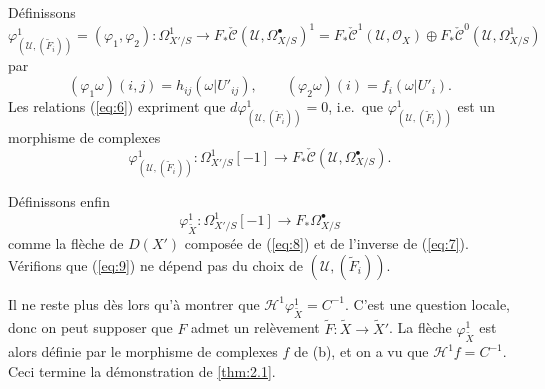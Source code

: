 \documentclass[12pt,a4paper]{article}
\theoremstyle{plain}
\theoremstyle{definition}
\theoremstyle{remark}
\newcommand{\cO}{\mathcal{O}}
\begin{document}
D\'efinissons
\[
\varphi^1_{(\mathscr{U}, (\tilde{F}_i))} = (\varphi_1, \varphi_2): \Omega^1_{X'/S} \to F_* \check{\mathscr{C}}(\mathscr{U}, \Omega^{\bullet}_{X/S})^1 = F_* \check{\mathscr{C}}^1(\mathscr{U}, \cO_X) \oplus F_* \check{\mathscr{C}}^0(\mathscr{U}, \Omega^1_{X/S})
\]
par
\[
(\varphi_1 \omega)(i,j) = h_{ij}(\omega|U'_{ij}), \qquad (\varphi_2 \omega)(i) = f_i(\omega|U'_i).
\]
Les relations (\ref{eq:6}) expriment que $d\varphi^1_{(\mathscr{U}, (\tilde{F}_i))} = 0$, i.e.~que $\varphi^1_{(\mathscr{U}, (\tilde{F}_i))}$ est un morphisme de complexes
\begin{equation}\label{eq:8}
\varphi^1_{(\mathscr{U}, (\tilde{F}_i))}: \Omega^1_{X'/S}[-1] \to F_* \check{\mathscr{C}}(\mathscr{U}, \Omega^{\bullet}_{X/S}).
\end{equation}

D\'efinissons enfin
\begin{equation}\label{eq:9}
\varphi^1_{\tilde{X}}: \Omega^1_{X'/S}[-1] \to F_* \Omega^{\bullet}_{X/S}
\end{equation}
comme la fl\`eche de $D(X')$ compos\'ee de (\ref{eq:8}) et de l'inverse de (\ref{eq:7}). V\'erifions que (\ref{eq:9}) ne d\'epend pas du choix de $(\mathscr{U}, (\tilde{F}_i))$.

Il ne reste plus d\`es lors qu'\`a montrer que $\mathscr{H}^1 \varphi^1_{\tilde{X}} = C^{-1}$. C'est une question locale, donc on peut supposer que $F$ admet un rel\`evement $\tilde{F}: \tilde{X} \to \tilde{X}'$. La fl\`eche $\varphi^1_{\tilde{X}}$ est alors d\'efinie par le morphisme de complexes $f$ de (b), et on a vu que $\mathscr{H}^1 f = C^{-1}$. Ceci termine la d\'emonstration de \ref{thm:2.1}.
\end{document}
